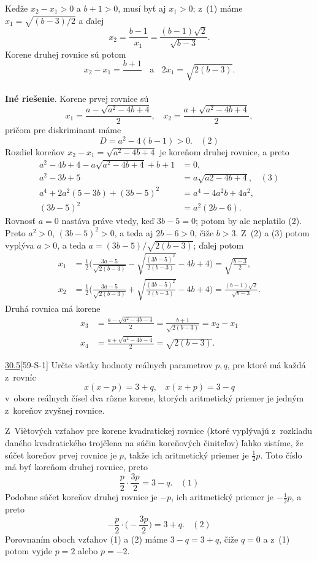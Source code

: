 Keďže $x_2 - x_1 > 0$ a $b + 1 > 0$, musí byť aj $x_1 > 0$; z~(1) máme $x_1 =\sqrt{(b - 3)/2}$ a ďalej
$$x_2 =\frac{b-1}{x_1}=\frac{(b - 1)\sqrt{2}}{\sqrt{b-3}}.$$
Korene druhej rovnice sú potom
$$x_2 - x_1 = \frac{b+1}{} \ \ \ \ \text{a} \ \ \ \  2x_1=\sqrt{2(b - 3)}.$$
\\
\textbf{Iné riešenie}. Korene prvej rovnice sú
$$x_1 = \frac{a -\sqrt{a^2 - 4b + 4}}{2}, \ \ \ \  x_2 =\frac{a +\sqrt{a^2 - 4b + 4}}{2},$$
pričom pre diskriminant máme
$$D = a^2 - 4(b - 1) > 0. \ \ \ \  (2)$$
Rozdiel koreňov $x_2 - x_1 =\sqrt{a^2 - 4b + 4}$ je koreňom druhej rovnice, a preto
\begin{align*}
a^2 - 4b + 4 - a \sqrt{a^2 - 4b + 4} + b + 1 &= 0,\\
a^2 - 3b + 5 &= a\sqrt{a 2 - 4b + 4}, \ \ \ \  (3)\\
a^4 + 2a^2 (5 - 3b) + (3b - 5)^2 &= a^4 - 4a^2 b + 4a^2,\\
(3b - 5)^2 &= a^2 (2b - 6).
\end{align*}
Rovnosť  $a = 0$ nastáva práve vtedy, keď $3b - 5 = 0$; potom by ale neplatilo (2). Preto $a^2 > 0$, $(3b - 5)^2 > 0$, a teda aj $2b - 6 > 0$, čiže $b > 3$. Z~(2) a (3) potom vyplýva $a > 0$, a teda $a = (3b - 5)/\sqrt{2(b - 3)}$; ďalej potom
\begin{align*}
x_1 &=\frac{1}{2}\bigg( \frac{3a-5}{\sqrt{2(b-3)}}-\sqrt{\frac{(3b-5)^2}{2(b-3)}}-4b+4\bigg)=\sqrt{\frac{b-3}{2}},\\
x_2 &=\frac{1}{2} \bigg( \frac{3a-5}{\sqrt{2(b-3)}}+\sqrt{\frac{(3b-5)^2}{2(b-3)}}-4b+4\bigg)=\frac{(b-1)\sqrt{2}}{\sqrt{b-3}}.
\end{align*}
Druhá rovnica má korene
\begin{align*}
x_3 &=\frac{a-\sqrt{a^2-4b-4}}{2}=\frac{b+1}{\sqrt{2(b-3)}}=x_2-x_1\\
x_4 &=\frac{a+\sqrt{a^2-4b-4}}{2}=\sqrt{2(b-3)}.
\end{align*}


\begin{tcolorbox}[breakable,notitle,boxrule=0pt,colback=light-gray,colframe=light-gray]\ul{30.5}[59-S-1] Určte všetky hodnoty reálnych parametrov $p, q$, pre ktoré má každá z~rovníc
$$x(x - p) = 3 + q, \ \ \ \ x(x + p) = 3 - q$$
v~obore reálnych čísel dva rôzne korene, ktorých aritmetický priemer je jedným z~koreňov
zvyšnej rovnice.

\end{tcolorbox}

\rieh Z~Viètových vzťahov pre korene kvadratickej rovnice (ktoré vyplývajú z~rozkladu daného kvadratického trojčlena na súčin koreňových činiteľov) ľahko zistíme, že súčet koreňov prvej rovnice je $p$, takže ich aritmetický priemer je $\frac{1}{2}p$. Toto číslo má byť
koreňom druhej rovnice, preto
$$\frac{p}{2}\cdot \frac{3p}{2}= 3 - q. \ \ \ \ (1)$$
Podobne súčet koreňov druhej rovnice je $-p$, ich aritmetický priemer je $-\frac{1}{2}p$, a preto
$$-\frac{p}{2}\cdot \bigg(- \frac{3p}{2}\bigg)= 3 + q. \ \ \ \ (2)$$
Porovnaním oboch vzťahov (1) a (2) máme $3 - q = 3 + q$, čiže $q = 0$ a z~(1) potom vyjde $p = 2$ alebo $p = -2$.

